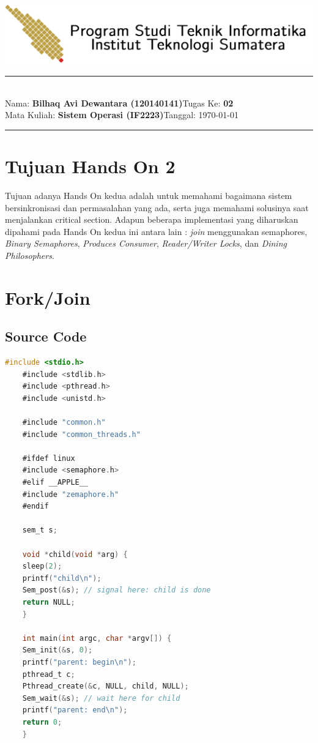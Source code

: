 \documentclass[11pt,a4paper]{article}
\newcommand{\stuid}{120140141}
\newcommand{\student}{\textbf{Bilhaq Avi Dewantara (\stuid{})}}
\newcommand{\course}{\textbf{Sistem Operasi (IF2223)}}
\newcommand{\assignment}{\textbf{02}} %
\begin{document}
\thispagestyle{empty}
\begin{center}
	\includegraphics[scale = 0.15]{Figure1/ifitera-header.png}
	\vspace{0.1cm}
\end{center}
\noindent
{\large
\rule{17cm}{0.2cm}\\[0.3cm]
Nama: \student \hfill Tugas Ke: \assignment\\[0.1cm]
Mata Kuliah: \course \hfill Tanggal: \today\\
\rule{17cm}{0.05cm}
\vspace{0.1cm}
}


\section{Tujuan Hands On 2}
    Tujuan adanya Hands On kedua adalah untuk memahami bagaimana sistem bersinkronisasi dan permasalahan yang ada, serta juga memahami solusinya saat menjalankan critical section.
	Adapun beberapa implementasi yang diharuskan dipahami pada Hands On kedua ini antara lain : \textit{join} menggunakan semaphores, \textit{Binary Semaphores}, 
	\textit{Produces Consumer}, \textit{Reader/Writer Locks}, dan \textit{Dining Philosophers}.


\section{Fork/Join}
\subsection{Source Code}
\begin{lstlisting}[language=C]
	#include <stdio.h>
	#include <stdlib.h>
	#include <pthread.h>
	#include <unistd.h>

	#include "common.h"
	#include "common_threads.h"

	#ifdef linux
	#include <semaphore.h>
	#elif __APPLE__
	#include "zemaphore.h"
	#endif

	sem_t s;

	void *child(void *arg) {
	sleep(2);
	printf("child\n");
	Sem_post(&s); // signal here: child is done
	return NULL;
	}

	int main(int argc, char *argv[]) {
	Sem_init(&s, 0); 
	printf("parent: begin\n");
	pthread_t c;
	Pthread_create(&c, NULL, child, NULL);
	Sem_wait(&s); // wait here for child
	printf("parent: end\n");
	return 0;
	}
	\end{lstlisting}
\end{document}
